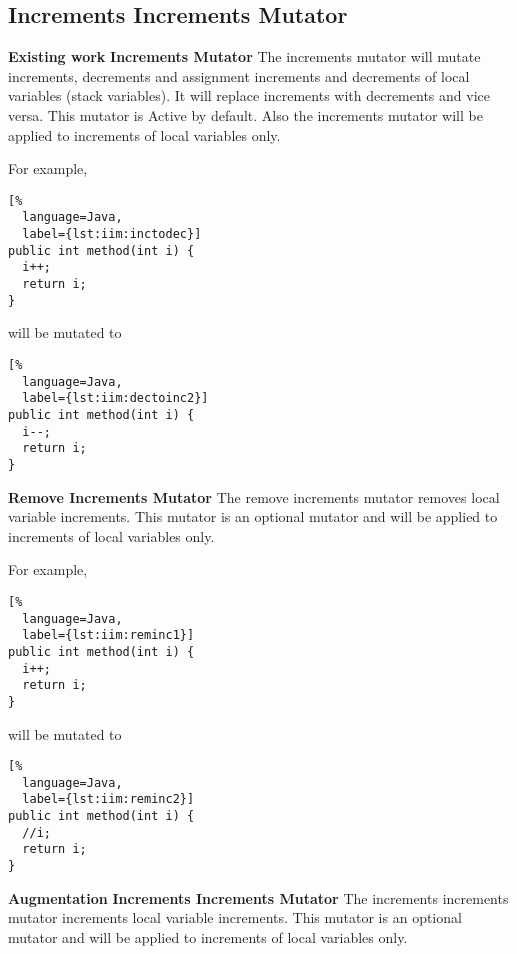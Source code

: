 \subsection{Increments Increments Mutator}
\textbf{Existing work}\newline
\textbf{Increments Mutator}\newline
The increments mutator will mutate increments, decrements and assignment increments and decrements of local variables (stack variables). It will replace increments with decrements and vice versa. This mutator is Active by default. Also the increments mutator will be applied to increments of local variables only.\newline


For example, \newline
\begin{lstlisting}[%
  language=Java,
  label={lst:iim:inctodec}]
public int method(int i) {
  i++;
  return i;
}
\end{lstlisting}

will be mutated to \newline

\begin{lstlisting}[%
  language=Java,
  label={lst:iim:dectoinc2}]
public int method(int i) {
  i--;
  return i;
}
\end{lstlisting}
\textbf{Remove Increments Mutator}\newline
The remove increments mutator removes local variable increments. This mutator is an optional mutator and will be applied to increments of local variables only.\newline


For example, \newline
\begin{lstlisting}[%
  language=Java,
  label={lst:iim:reminc1}]
public int method(int i) {
  i++;
  return i;
}
\end{lstlisting}

will be mutated to \newline

\begin{lstlisting}[%
  language=Java,
  label={lst:iim:reminc2}]
public int method(int i) {
  //i;
  return i;
}
\end{lstlisting}

\textbf{Augmentation}\newline
\textbf{Increments Increments Mutator}\newline
The increments increments mutator increments local variable increments. This mutator is an optional mutator and will be applied to increments of local variables only.\newline


